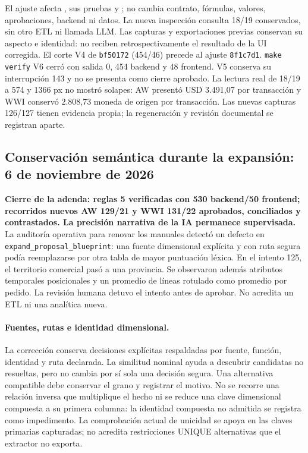 \documentclass[11pt,letterpaper]{article}
\newcommand{\file}[1]{\texttt{#1}}
\begin{document}
El ajuste afecta , sus pruebas y
; no cambia contrato, fórmulas, valores,
aprobaciones, backend ni datos. La nueva inspección consulta 18/19 conservados,
sin otro ETL ni llamada LLM. Las capturas y exportaciones previas conservan su
aspecto e identidad: no reciben retrospectivamente el resultado de la UI corregida.
El corte V4 de \file{bf50172} (454/46) precede al ajuste \file{8f1c7d1}.
\file{make verify} V6 cerró con salida 0, 454 backend y 48 frontend. V5 conserva
su interrupción 143 y no se presenta como cierre aprobado. La lectura real de 18/19
a 574 y 1366 px no mostró solapes: AW presentó USD 3.491,07 por transacción y WWI
conservó 2.808,73 moneda de origen por transacción. Las nuevas capturas 126/127
tienen evidencia propia; la regeneración y revisión documental se registran aparte.

\subsection{Conservación semántica durante la expansión: 6 de noviembre de 2026}

\textbf{Cierre de la adenda: reglas 5 verificadas con 530 backend/50 frontend; recorridos nuevos AW 129/21 y WWI 131/22 aprobados, conciliados y contrastados. La precisión narrativa de la IA permanece supervisada.}
La auditoría operativa para renovar los manuales detectó un defecto en
\file{expand\_proposal\_blueprint}: una fuente dimensional explícita y con ruta
segura podía reemplazarse por otra tabla de mayor puntuación léxica. En el
intento 125, el territorio comercial pasó a una provincia. Se observaron además
atributos temporales posicionales y un promedio de líneas rotulado como promedio
por pedido. La revisión humana detuvo el intento antes de aprobar. No acredita
un ETL ni una analítica nueva.

\paragraph{Fuentes, rutas e identidad dimensional.}
La corrección conserva decisiones explícitas respaldadas por fuente, función,
identidad y ruta declarada. La similitud nominal ayuda a descubrir candidatas
no resueltas, pero no cambia por sí sola una decisión segura. Una alternativa
compatible debe conservar el grano y registrar el motivo. No se recorre una
relación inversa que multiplique el hecho ni se reduce una clave dimensional
compuesta a su primera columna: la identidad compuesta no admitida se registra
como impedimento. La comprobación actual de unicidad se apoya en las claves
primarias capturadas; no acredita restricciones UNIQUE alternativas que el
extractor no exporta.
\end{document}
